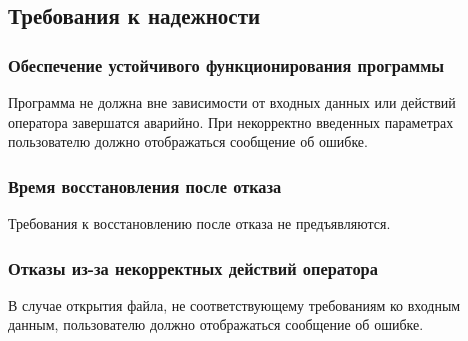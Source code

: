 \subsection{Требования к надежности}
\subsubsection{Обеспечение устойчивого функционирования программы}
Программа не должна вне зависимости от входных данных или действий оператора завершатся аварийно. При некорректно введенных параметрах пользователю должно отображаться сообщение об ошибке.
\subsubsection{Время восстановления после отказа}
Требования к восстановлению после отказа не предъявляются.
\subsubsection{Отказы из-за некорректных действий оператора}
В случае открытия файла, не соответствующему требованиям ко входным данным, пользователю должно отображаться сообщение об ошибке.
